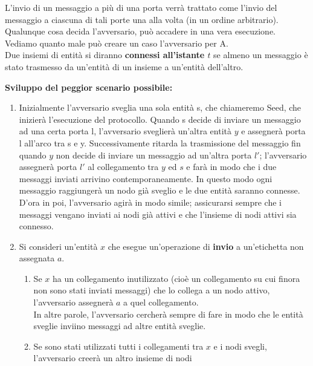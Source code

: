L'invio di un messaggio a più di una porta verrà trattato come l'invio del
messaggio a ciascuna di tali porte una alla volta (in un ordine arbitrario).\\
Qualunque cosa decida l'avversario, può accadere in una vera esecuzione. Vediamo
quanto male può creare un caso l'avversario per A.\\
Due insiemi di entità si diranno \textbf{connessi all'istante $t$} se almeno un
messaggio è stato trasmesso da un'entità di un insieme a un'entità dell'altro.

\textbf{Sviluppo del peggior scenario possibile:}
\begin{enumerate}
    \item Inizialmente l'avversario sveglia una sola entità s, che chiameremo
          Seed, che inizierà l'esecuzione del protocollo. Quando s decide di
          inviare un messaggio ad una certa porta l, l'avversario sveglierà
          un'altra entità $y$ e assegnerà porta l all'arco tra s e y.
          Successivamente ritarda la trasmissione del messaggio fin quando $y$
          non decide di inviare un messaggio ad un'altra porta $l'$;
          l'avversario assegnerà porta $l'$ al collegamento tra $y$ ed $s$ e
          farà in modo che i due messaggi inviati arrivino contemporaneamente.
          In questo modo ogni messaggio raggiungerà un nodo già sveglio e le due
          entità saranno connesse.\\
          D'ora in poi, l'avversario agirà in modo simile; assicurarsi sempre
          che i messaggi vengano inviati ai nodi già attivi e che l'insieme di
          nodi attivi sia connesso.
    \item Si consideri un'entità $x$ che esegue un'operazione di \textbf{invio}
          a un'etichetta non assegnata $a$.
          \begin{enumerate}
              \item Se $x$ ha un collegamento inutilizzato (cioè un collegamento
                    su cui finora non sono stati inviati messaggi) che lo
                    collega a un nodo attivo, l'avversario assegnerà $a$ a quel
                    collegamento.\\
                    In altre parole, l'avversario cercherà sempre di fare in
                    modo che le entità sveglie inviino messaggi ad altre entità
                    sveglie.
              \item Se sono stati utilizzati tutti i collegamenti tra $x$ e i
                    nodi svegli, l'avversario creerà un altro insieme di nodi

\end{enumerate}
\end{enumerate}
